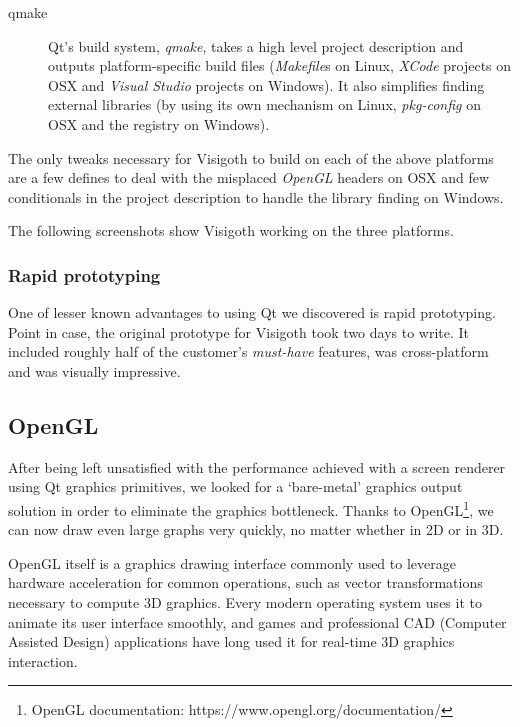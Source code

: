 \documentclass[a4paper,11pt,titlepage]{article}
\newcommand{\buzz}[1]{\emph{#1}}
\begin{document}
\begin{description}
\item [qmake] Qt's build system, \buzz{qmake}, takes a high level
  project description and outputs platform-specific build files
  (\buzz{Makefile}s on Linux, \buzz{XCode} projects on OSX and
  \buzz{Visual Studio} projects on Windows). It also simplifies
  finding external libraries (by using its own mechanism on Linux,
  \buzz{pkg-config} on OSX and the registry on Windows).
\end{description}

The only tweaks necessary for Visigoth to build on each of the above
platforms are a few defines to deal with the misplaced \buzz{OpenGL}
headers on OSX and few conditionals in the project description to
handle the library finding on Windows.

The following screenshots show Visigoth working on the three
platforms.

\subsubsection{Rapid prototyping}

One of lesser known advantages to using Qt we discovered is rapid
prototyping. Point in case, the original prototype for Visigoth took
two days to write. It included roughly half of the customer's
\emph{must-have} features, was cross-platform and was visually
impressive.

\subsection{OpenGL}

After being left unsatisfied with the performance achieved with a
screen renderer using Qt graphics primitives, we looked for a `bare-metal'
graphics output solution in order to eliminate the graphics bottleneck.
Thanks to OpenGL\footnote{OpenGL documentation:
https://www.opengl.org/documentation/},
we can now draw even large graphs very quickly,
no matter whether in 2D or in 3D.

OpenGL itself is a graphics drawing interface commonly used to
leverage hardware acceleration for common operations, such as vector
transformations necessary to compute 3D graphics. Every modern
operating system uses it to animate its user interface smoothly,
and games and professional CAD (Computer Assisted Design) applications
have long used it for real-time 3D graphics interaction.
\end{document}
